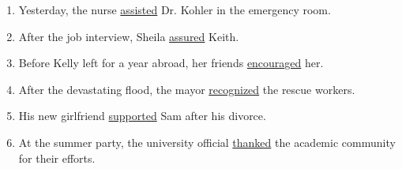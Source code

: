 {\begin{enumerate}
\begin{enumerate}
\item Yesterday, the nurse \underline{assisted} Dr. Kohler in the emergency room.
\item After the job interview, Sheila \underline{assured} Keith.
\item Before Kelly left for a year abroad, her friends \underline{encouraged} her.
\item After the devastating flood, the mayor \underline{recognized} the rescue workers.
\item His new girlfriend \underline{supported} Sam after his divorce.
\item At the summer party, the university official \underline{thanked} the academic community for their efforts.
\end{enumerate}
\end{enumerate}
}

